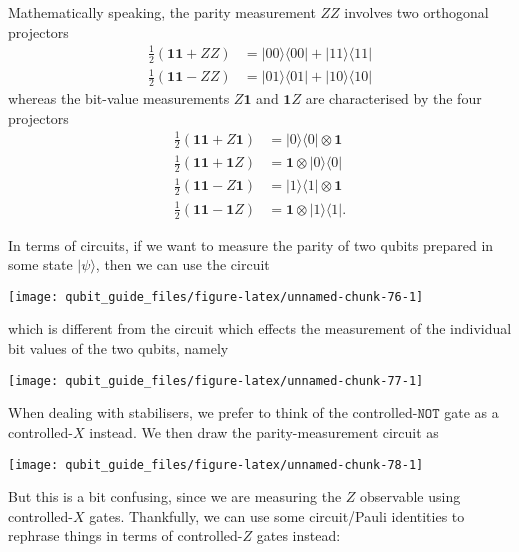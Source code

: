 \documentclass[fleqn]{article}
\begin{document}
Mathematically speaking, the parity measurement \(ZZ\) involves two orthogonal projectors
\[
  \begin{aligned}
    \frac{1}{2}(\mathbf{1}\mathbf{1}+ZZ)
    &= |00\rangle\langle 00|+|11\rangle\langle 11|
  \\\frac{1}{2}(\mathbf{1}\mathbf{1}-ZZ)
    &= |01\rangle\langle 01|+|10\rangle\langle 10|
  \end{aligned}
\]
whereas the bit-value measurements \(Z\mathbf{1}\) and \(\mathbf{1}Z\) are characterised by the four projectors
\[
  \begin{aligned}
    \frac{1}{2}(\mathbf{1}\mathbf{1}+Z\mathbf{1})
    &= |0\rangle\langle 0|\otimes\mathbf{1}
  \\\frac{1}{2}(\mathbf{1}\mathbf{1}+\mathbf{1}Z)
    &= \mathbf{1}\otimes|0\rangle\langle 0|
  \\\frac{1}{2}(\mathbf{1}\mathbf{1}-Z\mathbf{1})
    &= |1\rangle\langle 1|\otimes\mathbf{1}
  \\\frac{1}{2}(\mathbf{1}\mathbf{1}-\mathbf{1}Z)
    &= \mathbf{1}\otimes|1\rangle\langle 1|.
  \end{aligned}
\]

In terms of circuits, if we want to measure the parity of two qubits prepared in some state \(|\psi\rangle\), then we can use the circuit

\begin{center}\texttt{[image: qubit\_guide\_files/figure-latex/unnamed-chunk-76-1]} \end{center}

which is different from the circuit which effects the measurement of the individual bit values of the two qubits, namely

\begin{center}\texttt{[image: qubit\_guide\_files/figure-latex/unnamed-chunk-77-1]} \end{center}

When dealing with stabilisers, we prefer to think of the controlled-\(\texttt{NOT}\) gate as a controlled-\(X\) instead.
We then draw the parity-measurement circuit as

\begin{center}\texttt{[image: qubit\_guide\_files/figure-latex/unnamed-chunk-78-1]} \end{center}

But this is a bit confusing, since we are measuring the \(Z\) observable using controlled-\(X\) gates.
Thankfully, we can use some circuit/Pauli identities to rephrase things in terms of controlled-\(Z\) gates instead:
\end{document}
